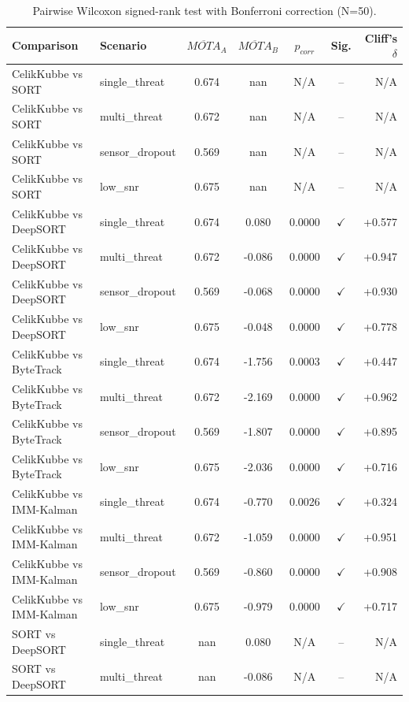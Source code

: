 \begin{table}[ht]
\centering
\caption{Pairwise Wilcoxon signed-rank test with Bonferroni correction (N=50).}
\label{tab:significance}
\small
\begin{tabular}{llccccr}
\toprule
Comparison & Scenario & $\overline{MOTA}_A$ & $\overline{MOTA}_B$ & $p_{corr}$ & Sig. & Cliff's $\delta$ \\
\midrule
CelikKubbe vs SORT & single_threat & 0.674 & nan & N/A & -- & N/A \\
CelikKubbe vs SORT & multi_threat & 0.672 & nan & N/A & -- & N/A \\
CelikKubbe vs SORT & sensor_dropout & 0.569 & nan & N/A & -- & N/A \\
CelikKubbe vs SORT & low_snr & 0.675 & nan & N/A & -- & N/A \\
CelikKubbe vs DeepSORT & single_threat & 0.674 & 0.080 & 0.0000 & $\checkmark$ & +0.577 \\
CelikKubbe vs DeepSORT & multi_threat & 0.672 & -0.086 & 0.0000 & $\checkmark$ & +0.947 \\
CelikKubbe vs DeepSORT & sensor_dropout & 0.569 & -0.068 & 0.0000 & $\checkmark$ & +0.930 \\
CelikKubbe vs DeepSORT & low_snr & 0.675 & -0.048 & 0.0000 & $\checkmark$ & +0.778 \\
CelikKubbe vs ByteTrack & single_threat & 0.674 & -1.756 & 0.0003 & $\checkmark$ & +0.447 \\
CelikKubbe vs ByteTrack & multi_threat & 0.672 & -2.169 & 0.0000 & $\checkmark$ & +0.962 \\
CelikKubbe vs ByteTrack & sensor_dropout & 0.569 & -1.807 & 0.0000 & $\checkmark$ & +0.895 \\
CelikKubbe vs ByteTrack & low_snr & 0.675 & -2.036 & 0.0000 & $\checkmark$ & +0.716 \\
CelikKubbe vs IMM-Kalman & single_threat & 0.674 & -0.770 & 0.0026 & $\checkmark$ & +0.324 \\
CelikKubbe vs IMM-Kalman & multi_threat & 0.672 & -1.059 & 0.0000 & $\checkmark$ & +0.951 \\
CelikKubbe vs IMM-Kalman & sensor_dropout & 0.569 & -0.860 & 0.0000 & $\checkmark$ & +0.908 \\
CelikKubbe vs IMM-Kalman & low_snr & 0.675 & -0.979 & 0.0000 & $\checkmark$ & +0.717 \\
SORT vs DeepSORT & single_threat & nan & 0.080 & N/A & -- & N/A \\
SORT vs DeepSORT & multi_threat & nan & -0.086 & N/A & -- & N/A \\

\end{tabular}
\end{table}
